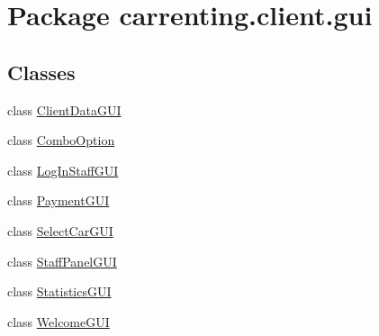 \hypertarget{namespacecarrenting_1_1client_1_1gui}{}\section{Package carrenting.\+client.\+gui}
\label{namespacecarrenting_1_1client_1_1gui}
\subsection*{Classes}
\begin{DoxyCompactItemize}
\item 
class \mbox{\hyperlink{classcarrenting_1_1client_1_1gui_1_1_client_data_g_u_i}{Client\+Data\+G\+UI}}
\item 
class \mbox{\hyperlink{classcarrenting_1_1client_1_1gui_1_1_combo_option}{Combo\+Option}}
\item 
class \mbox{\hyperlink{classcarrenting_1_1client_1_1gui_1_1_log_in_staff_g_u_i}{Log\+In\+Staff\+G\+UI}}
\item 
class \mbox{\hyperlink{classcarrenting_1_1client_1_1gui_1_1_payment_g_u_i}{Payment\+G\+UI}}
\item 
class \mbox{\hyperlink{classcarrenting_1_1client_1_1gui_1_1_select_car_g_u_i}{Select\+Car\+G\+UI}}
\item 
class \mbox{\hyperlink{classcarrenting_1_1client_1_1gui_1_1_staff_panel_g_u_i}{Staff\+Panel\+G\+UI}}
\item 
class \mbox{\hyperlink{classcarrenting_1_1client_1_1gui_1_1_statistics_g_u_i}{Statistics\+G\+UI}}
\item 
class \mbox{\hyperlink{classcarrenting_1_1client_1_1gui_1_1_welcome_g_u_i}{Welcome\+G\+UI}}
\end{DoxyCompactItemize}
